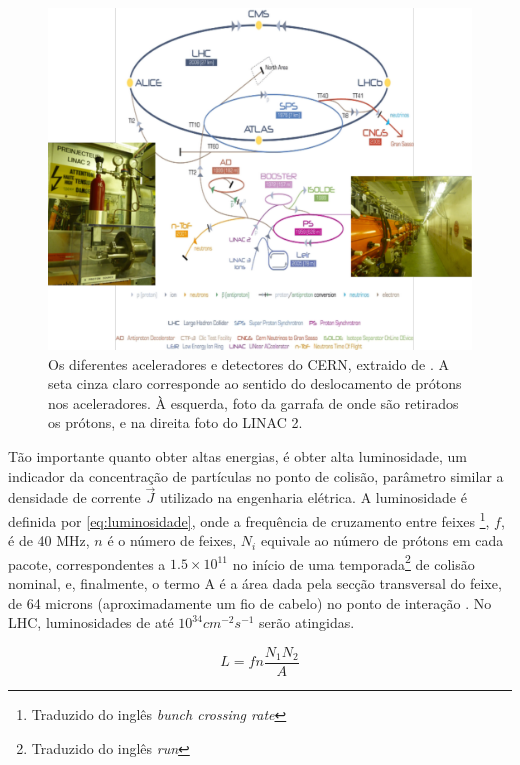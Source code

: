 \begin{figure}[h!t]
\centering
\includegraphics[width=\textwidth]{imagens/lhc_garrafa_linac2.pdf}
\caption{Os diferentes aceleradores e detectores do CERN, extraido de
\cite{cern_accelerators}. A seta cinza claro corresponde ao sentido do
deslocamento de prótons nos aceleradores. À esquerda, foto da garrafa
de onde são retirados os prótons, e na direita foto do LINAC 2.}
\label{fig:esquema_aceleradores}
\end{figure}

Tão importante quanto obter altas energias, é obter alta
luminosidade, um indicador da concentração 
de partículas no ponto de colisão, parâmetro similar a densidade de 
corrente $\overrightarrow{J}$ utilizado na engenharia elétrica. A luminosidade é definida por
\ref{eq:luminosidade}, onde a frequência de cruzamento entre feixes
\footnote{Traduzido do inglês \emph{bunch crossing rate}}, $f$, é de 40 MHz, $n$ é o número de feixes, 
$N_i$ equivale ao número de prótons em
cada pacote, correspondentes a $1.5\times10^{11}$ no início de uma
temporada\footnote{Traduzido do inglês \emph{run}} de colisão nominal, e,
finalmente, o termo A é a área dada pela secção transversal do feixe, 
de 64 microns (aproximadamente um fio de cabelo) no ponto de interação
\cite{webLHC}. No LHC, luminosidades de até $10^{34}cm^{-2}s^{-1}$ serão
atingidas.

\begin{equation} \label{eq:luminosidade}
L=fn\frac{N_1 N_2}{A}
\end{equation}

